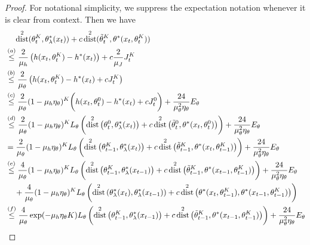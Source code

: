 \documentclass{article}
\theoremstyle{plain}
\theoremstyle{definition}
\theoremstyle{remark}
\DeclareMathOperator{\dist}{dist}
\begin{document}
\begin{proof}
For notational simplicity, we suppress the expectation notation whenever it is clear from context. Then we have
\begin{align}\notag
        & \quad \, \dist^2(\theta_t^K, \theta_\lambda^*(x_t)) + c\dist^2 (\tilde{\theta}_t^K, \theta^*(x_t,\theta_t^K))  \\
        & \overset{(a)}{\leq} \frac{2}{\mu_h} \left( h(x_t,\theta_t^{K}) - h^*(x_t)\right) + c\frac{2}{\mu_J} J_t^K  \\
        & \overset{(b)}{\leq}\frac{2}{\mu_\theta} \left( h(x_t,\theta_t^{K}) - h^*(x_t)+ c J_t^K\right) \\ 
         & \overset{(c)}{\leq} \frac{2}{\mu_\theta} (1 - \mu_h \eta_\theta)^K  \bigg(h(x_t,\theta_t^{0}) - h^*(x_t) + c J_t^0 \bigg)  + \frac{24}{\mu_\theta^2 \eta_\theta} E_\theta\\
         & \overset{(d)}{\leq} \frac{2}{\mu_\theta} (1 - \mu_h \eta_\theta)^K L_{\theta} \left(\dist^2\left(\theta_t^0, \theta_\lambda^*(x_t) \right)+ c  \dist^2\left(\tilde{\theta}_t^0, \theta^*(x_t,\theta_t^0)\right)\right)+ \frac{24}{\mu_\theta^2 \eta_\theta} E_\theta 
         \label{eq: dist-bound-stochastic-1-large-batch} \\
         & = \frac{2}{\mu_\theta} (1 - \mu_h \eta_\theta)^K L_{\theta} \left(\dist^2\left(\theta_{t-1}^K, \theta_\lambda^*(x_t) \right)+ c  \dist^2\left(\tilde{\theta}_{t-1}^K, \theta^*(x_t,\theta_{t-1}^K)\right)\right)+ \frac{24}{\mu_\theta^2 \eta_\theta} E_\theta \\
         & \overset{(e)}{\leq} \frac{4}{\mu_\theta} (1 - \mu_h \eta_\theta)^K L_{\theta} \left(\dist^2\left(\theta_{t-1}^K, \theta_\lambda^*(x_{t-1}) \right)+ c  \dist^2\left(\tilde{\theta}_{t-1}^K, \theta^*(x_{t-1},\theta_{t-1}^K)\right) \right)+ \frac{24}{\mu_\theta^2 \eta_\theta} E_\theta \notag \\
         & \quad \, +  \frac{4}{\mu_\theta} (1 - \mu_h \eta_\theta)^K L_{\theta} \left(\dist^2\left(\theta_\lambda^*(x_{t}), \theta_\lambda^*(x_{t-1}) \right)+ c  \dist^2\left(\theta^*(x_{t},\theta_{t-1}^K), \theta^*(x_{t-1},\theta_{t-1}^K)\right) \right) \\
         & \overset{(f)}{\leq}  \frac{4}{\mu_\theta} \exp( - \mu_h \eta_\theta K ) L_{\theta} \left(\dist^2\left(\theta_{t-1}^K, \theta_\lambda^*(x_{t-1}) \right)+ c  \dist^2\left(\tilde{\theta}_{t-1}^K, \theta^*(x_{t-1},\theta_{t-1}^K)\right) \right) + \frac{24}{\mu_\theta^2 \eta_\theta} E_\theta \notag \\

\end{align}
\end{proof}
\end{document}
